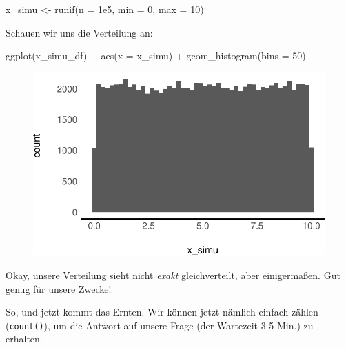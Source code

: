 \documentclass[
  a4paper,
  DIV=11]{scrreprt}
\newenvironment{Shaded}{\begin{snugshade}}{\end{snugshade}}
\newcommand{\AttributeTok}[1]{\textcolor[rgb]{0.40,0.45,0.13}{#1}}
\newcommand{\DecValTok}[1]{\textcolor[rgb]{0.68,0.00,0.00}{#1}}
\newcommand{\FloatTok}[1]{\textcolor[rgb]{0.68,0.00,0.00}{#1}}
\newcommand{\FunctionTok}[1]{\textcolor[rgb]{0.28,0.35,0.67}{#1}}
\newcommand{\NormalTok}[1]{\textcolor[rgb]{0.00,0.23,0.31}{#1}}
\newcommand{\OtherTok}[1]{\textcolor[rgb]{0.00,0.23,0.31}{#1}}
\newcommand{\SpecialCharTok}[1]{\textcolor[rgb]{0.37,0.37,0.37}{#1}}
\theoremstyle{definition}
\theoremstyle{remark}
\begin{document}
\begin{Shaded}
\begin{Highlighting}[]
\NormalTok{x\_simu }\OtherTok{\textless{}{-}} \FunctionTok{runif}\NormalTok{(}\AttributeTok{n =} \FloatTok{1e5}\NormalTok{, }\AttributeTok{min =} \DecValTok{0}\NormalTok{, }\AttributeTok{max =} \DecValTok{10}\NormalTok{)}
\end{Highlighting}
\end{Shaded}

Schauen wir uns die Verteilung an:

\begin{Shaded}
\begin{Highlighting}[]
\FunctionTok{ggplot}\NormalTok{(x\_simu\_df) }\SpecialCharTok{+}
  \FunctionTok{aes}\NormalTok{(}\AttributeTok{x =}\NormalTok{ x\_simu) }\SpecialCharTok{+}
  \FunctionTok{geom\_histogram}\NormalTok{(}\AttributeTok{bins =} \DecValTok{50}\NormalTok{)}
\end{Highlighting}
\end{Shaded}

\begin{figure}[H]

{\centering \includegraphics{./Verteilungen_files/figure-pdf/unnamed-chunk-9-1.pdf}

}

\end{figure}

Okay, unsere Verteilung sieht nicht \emph{exakt} gleichverteilt, aber
einigermaßen. Gut genug für unsere Zwecke!

So, und jetzt kommt das Ernten. Wir können jetzt nämlich einfach zählen
(\texttt{count()}), um die Antwort auf unsere Frage (der Wartezeit 3-5
Min.) zu erhalten.
\end{document}
